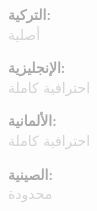 \documentclass[10pt,a4paper]{article}
\begin{document}
\vspace{1pt}
\noindent
\begin{minipage}[t]{0.24\textwidth}
  \textcolor{darkgray}{\textbf{التركية:}} \\
  \textcolor{lightgray}{\small أصلية}
\end{minipage}%
\hfill
\begin{minipage}[t]{0.24\textwidth}
  \textcolor{darkgray}{\textbf{الإنجليزية:}} \\
  \textcolor{lightgray}{\small احترافية كاملة}
\end{minipage}%
\hfill
\begin{minipage}[t]{0.24\textwidth}
  \textcolor{darkgray}{\textbf{الألمانية:}} \\
  \textcolor{lightgray}{\small احترافية كاملة}
\end{minipage}%
\hfill
\begin{minipage}[t]{0.24\textwidth}
  \textcolor{darkgray}{\textbf{الصينية:}} \\
  \textcolor{lightgray}{\small محدودة}
\end{minipage}
\end{document}

